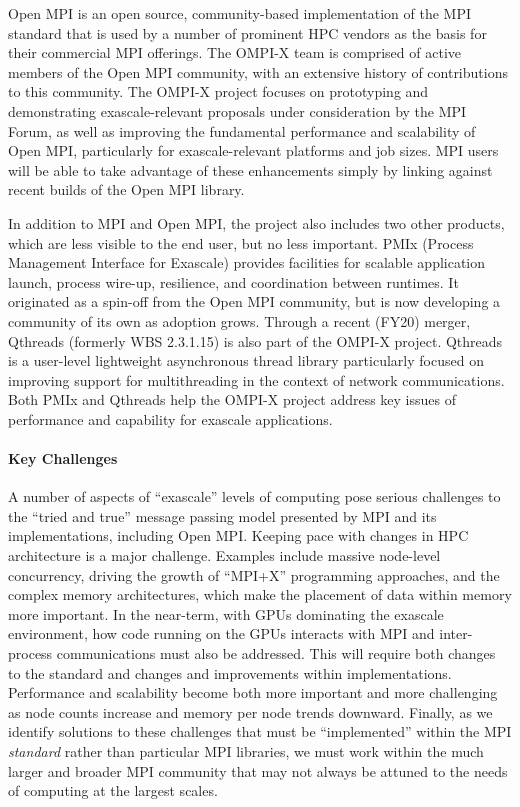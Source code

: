 Open MPI is an open source, community-based implementation of the MPI
standard that is used by a number of prominent
HPC vendors as the basis for their commercial MPI offerings.   The
OMPI-X team is comprised of active members of the Open MPI community,
with an extensive history of contributions to this community.
The OMPI-X project focuses on prototyping
and demonstrating exascale-relevant proposals under consideration by
the MPI Forum, as well as improving the fundamental performance and
scalability of Open MPI, particularly for exascale-relevant platforms
and job sizes.  
MPI users will be able to take advantage of these
enhancements simply by linking against recent builds of the Open MPI
library.

In addition to MPI and Open MPI, the project also includes two other products, 
which are less visible to the end user, but no less important.  
PMIx (Process Management Interface for Exascale) provides facilities for 
scalable application launch, process wire-up, resilience, and coordination between runtimes.  
It originated as a spin-off from the Open MPI community, but is now developing a 
community of its own as adoption grows.  Through a recent (FY20) merger, 
Qthreads (formerly WBS 2.3.1.15) is also part of the OMPI-X project.  Qthreads is a 
user-level lightweight asynchronous thread library particularly focused on improving support for 
multithreading in the context of network communications.  Both PMIx and Qthreads help the 
OMPI-X project address key issues of performance and capability for exascale applications.


\paragraph{Key  Challenges}
A number of aspects of ``exascale'' levels
of computing pose serious challenges to the ``tried and true'' message
passing model presented by MPI and its implementations, including Open
MPI.
%
Keeping pace with changes in HPC architecture is a major challenge.
Examples include massive node-level concurrency, driving the 
growth of ``MPI+X'' programming approaches, 
and the complex memory architectures, which make the placement of data 
within memory more important. In the near-term, with GPUs dominating the exascale 
environment, how code running on the GPUs interacts with MPI and inter-process 
communications must also be addressed.  This will require both changes to the standard 
and changes and improvements within implementations.
%
Performance and scalability become both more important and more
challenging as node counts increase
and memory per node trends downward.
%
Finally, as we identify solutions to these challenges that must be
``implemented'' within the MPI \emph{standard} rather than particular MPI libraries,
we must work within the much larger and broader MPI
community that may not always be attuned to the needs of computing at the largest scales.

